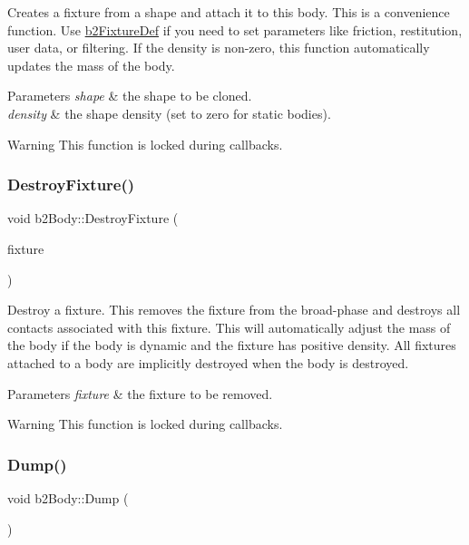Creates a fixture from a shape and attach it to this body. This is a convenience function. Use \mbox{\hyperlink{structb2_fixture_def}{b2\+Fixture\+Def}} if you need to set parameters like friction, restitution, user data, or filtering. If the density is non-\/zero, this function automatically updates the mass of the body. 
\begin{DoxyParams}{Parameters}
{\em shape} & the shape to be cloned. \\
\hline
{\em density} & the shape density (set to zero for static bodies). \\
\hline
\end{DoxyParams}
\begin{DoxyWarning}{Warning}
This function is locked during callbacks. 
\end{DoxyWarning}
\mbox{\label{classb2_body_a856d1df86b7bded91f02d8cfcaea1c2f}} 
\subsubsection{\texorpdfstring{DestroyFixture()}{DestroyFixture()}}
{\footnotesize\ttfamily void b2\+Body\+::\+Destroy\+Fixture (\begin{DoxyParamCaption}\item[{\mbox{\hyperlink{classb2_fixture}{b2\+Fixture}} $\ast$}]{fixture }\end{DoxyParamCaption})}

Destroy a fixture. This removes the fixture from the broad-\/phase and destroys all contacts associated with this fixture. This will automatically adjust the mass of the body if the body is dynamic and the fixture has positive density. All fixtures attached to a body are implicitly destroyed when the body is destroyed. 
\begin{DoxyParams}{Parameters}
{\em fixture} & the fixture to be removed. \\
\hline
\end{DoxyParams}
\begin{DoxyWarning}{Warning}
This function is locked during callbacks. 
\end{DoxyWarning}
\mbox{\label{classb2_body_ac9e482f7d9df92801c24e79a7e751d06}} 
\subsubsection{\texorpdfstring{Dump()}{Dump()}}
{\footnotesize\ttfamily void b2\+Body\+::\+Dump (\begin{DoxyParamCaption}{ }\end{DoxyParamCaption})}



